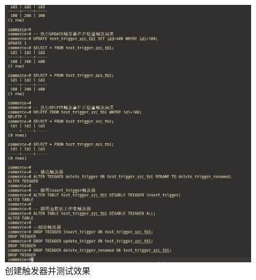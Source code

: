 \begin{enumerate}
\begin{figure}[H]
\begin{center}
    \includegraphics[width=0.95\textwidth]{./figures/trigger1.jpg}
  \end{center}
  \caption{创建触发器并测试效果}
\end{figure}
\end{enumerate}

